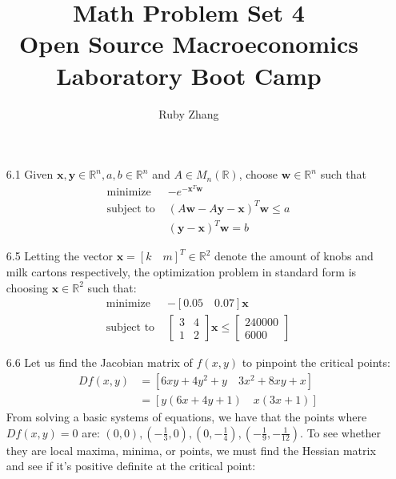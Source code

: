 \documentclass[letterpaper,12pt]{article}
\theoremstyle{definition}
\begin{document}
\title{Math Problem Set 4 \\
Open Source Macroeconomics Laboratory Boot Camp}
\author{Ruby Zhang}
\maketitle

\begin{enumerate}
  \item[6.1]
    Given $\mathbf{x},\mathbf{y} \in \mathbb{R}^n, a,b \in \mathbb{R}^n$ and $A \in M_n(\mathbb{R})$, choose $\mathbf{w}\in\mathbb{R}^n$ such that
    \begin{align*}
      \text{minimize }&-e^{-\mathbf{x}^T\mathbf{w}} \\
      \text{subject to }& (A\mathbf{w}-A\mathbf{y}-\mathbf{x})^T\mathbf{w} \leq a \\
      & (\mathbf{y}-\mathbf{x})^T\mathbf{w} = b
    \end{align*}
  \item[6.5]
    Letting the vector $\mathbf{x} = [k\quad m]^T \in \mathbb{R}^2$ denote the amount of knobs and milk cartons respectively, the optimization problem in standard form is choosing $\mathbf{x} \in \mathbb{R}^2$ such that:
    \begin{align*}
      \text{minimize }&-[0.05 \quad 0.07]\mathbf{x}\\
      \text{subject to }&
        \begin{bmatrix}
          3 & 4\\
          1 & 2
        \end{bmatrix}
      \mathbf{x}\leq
      \begin{bmatrix}
       240000 \\
       6000
      \end{bmatrix}
    \end{align*}
  \item[6.6]
    Let us find the Jacobian matrix of $f(x,y)$ to pinpoint the critical points:
    \begin{align*}
      Df(x,y) &= [6xy+4y^2+y \quad 3x^2+8xy+x] \\
      &=[y(6x+4y+1)\quad x(3x+1)]
    \end{align*}
    From solving a basic systems of equations, we have that the points where $Df(x,y)=0$ are: $(0,0), (-\frac{1}{3},0), (0,-\frac{1}{4}), (-\frac{1}{9},-\frac{1}{12})$. To see whether they are local maxima, minima, or points, we must find the Hessian matrix and see if it's positive definite at the critical point:

\end{enumerate}
\end{document}
